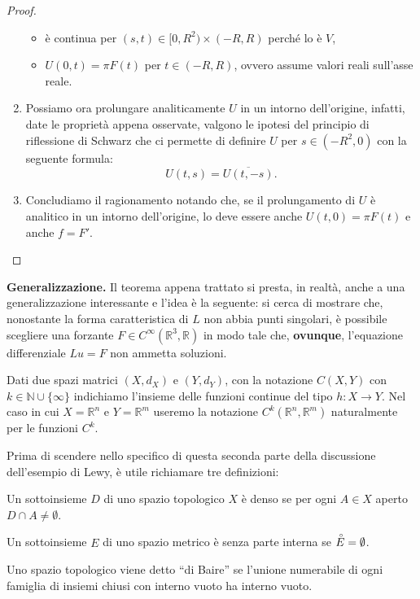 \begin{proof}
\begin{enumerate}[1.]
\begin{itemize}
\item
è continua per $(s,t) \in [0,R^2) \times (-R,R)$ perché lo è $V$,
\item
$U(0,t)=\pi F(t)$ per $t\in (-R,R)$, ovvero assume valori reali sull'asse reale.
\end{itemize}
\item
Possiamo ora prolungare analiticamente $U$ in un intorno dell'origine, infatti, 
date le proprietà appena osservate, valgono le ipotesi del principio di riflessione di Schwarz che ci permette 
di definire $U$ per $s\in (-R^2,0)$ con la seguente formula: $$U(t,s)=\overline{U(t,-s)}.$$
\item
Concludiamo il ragionamento notando che, se il prolungamento di $U$ è analitico in un intorno dell'origine, lo deve essere anche $U(t,0)=\pi F(t)$ e anche $f=F'$. \qedhere
\end{enumerate}
\end{proof}

\textbf{Generalizzazione.} Il teorema appena trattato si presta, in realtà, anche a una generalizzazione interessante e l'idea è la seguente: si cerca di mostrare che, nonostante la forma caratteristica di $L$ non abbia punti singolari, è possibile scegliere una forzante $F \in C^{\infty} (\mathbb{R}^3, \mathbb{R})$ in modo tale che, \textbf{ovunque}, l'equazione differenziale $Lu=F$ non ammetta soluzioni.

\begin{remark}
Dati due spazi matrici $(X,d_X)$ e $(Y,d_Y)$, con la notazione $C(X,Y)$ con $k \in \mathbb{N} \cup \{\infty\}$ indichiamo l'insieme delle funzioni continue del tipo $h:X \rightarrow Y$. Nel caso in cui $X=\mathbb{R}^n$ e $Y=\mathbb{R}^m$ useremo la notazione $C^k(\mathbb{R}^n,\mathbb{R}^m)$ naturalmente per le funzioni $C^k$.
\end{remark}

Prima di scendere nello specifico di questa seconda parte della discussione dell'esempio di Lewy, è utile richiamare tre definizioni:
\begin{definition}
Un sottoinsieme $D$ di uno spazio topologico $X$ è denso se per ogni $ A \in X$ aperto $D \cap A \neq \emptyset $.
\end{definition}
\begin{definition}
Un sottoinsieme $E$ di uno spazio metrico è senza parte interna se $\accentset{\circ}{E}=\emptyset$.
\end{definition}
\begin{definition}
Uno spazio topologico viene detto ``di Baire'' se l'unione numerabile di ogni famiglia di insiemi chiusi con interno vuoto ha interno vuoto.
\end{definition}

